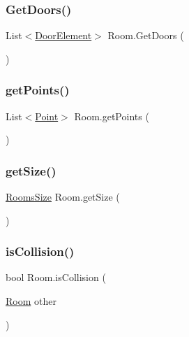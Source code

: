 \subsubsection{\texorpdfstring{Get\+Doors()}{GetDoors()}}
{\footnotesize\ttfamily List$<$\mbox{\hyperlink{class_door_element}{Door\+Element}}$>$ Room.\+Get\+Doors (\begin{DoxyParamCaption}{ }\end{DoxyParamCaption})}

\mbox{\label{class_room_a8536918397f63ca1101ac0502f284ba4}} 
\subsubsection{\texorpdfstring{get\+Points()}{getPoints()}}
{\footnotesize\ttfamily List$<$\mbox{\hyperlink{class_point}{Point}}$>$ Room.\+get\+Points (\begin{DoxyParamCaption}{ }\end{DoxyParamCaption})}

\mbox{\label{class_room_a7c1dafb422b0f3e1673c7b94beb97c68}} 
\subsubsection{\texorpdfstring{get\+Size()}{getSize()}}
{\footnotesize\ttfamily \mbox{\hyperlink{_rooms_enum_8cs_a7eb4c91eb68aa4d08f6f9afb7f9d36ed}{Rooms\+Size}} Room.\+get\+Size (\begin{DoxyParamCaption}{ }\end{DoxyParamCaption})}

\mbox{\label{class_room_a8335d4c9d01753a0510bc234c68d6441}} 
\subsubsection{\texorpdfstring{is\+Collision()}{isCollision()}\hspace{0.1cm}{\footnotesize\ttfamily [1/2]}}
{\footnotesize\ttfamily bool Room.\+is\+Collision (\begin{DoxyParamCaption}\item[{\mbox{\hyperlink{class_room}{Room}}}]{other }\end{DoxyParamCaption})}

